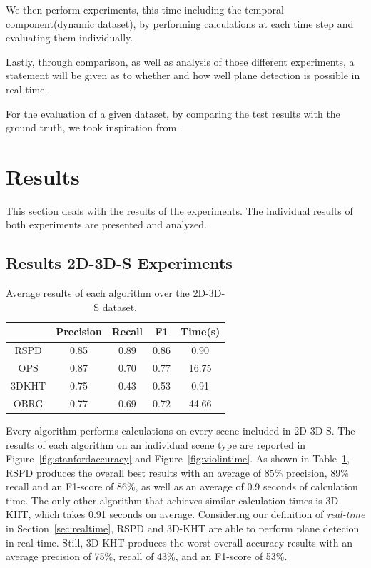 \documentclass[main.tex]{subfiles}
\begin{document}
We then perform experiments, this time including the temporal component(dynamic dataset), by performing calculations at each time step and evaluating them individually.

Lastly, through comparison, as well as analysis of those different experiments, a statement will be given as to whether and how well plane detection is
possible in real-time.

For the evaluation of a given dataset, by comparing the test results with the ground truth, we took inspiration from \citeauthor{Araújo_Oliveira_2020} \cite[Section~4]{Araújo_Oliveira_2020}.


\section{Results}
This section deals with the results of the experiments. The individual results of both experiments are presented and analyzed. 

\subsection{Results 2D-3D-S Experiments}

\begin{table}[H]
    \centering
    \begin{tabular}{c|cccc}
              & Precision & Recall & F1   & Time(s) \\ \hline
        RSPD  & 0.85      & 0.89   & 0.86 & 0.90    \\
        OPS   & 0.87      & 0.70   & 0.77 & 16.75   \\
        3DKHT & 0.75      & 0.43   & 0.53 & 0.91    \\
        OBRG  & 0.77      & 0.69   & 0.72 & 44.66
    \end{tabular}
    \caption[Overall 2D-3D-S Results]{Average results of each algorithm over the 2D-3D-S dataset.}
    \label{tab:algo-acc}
\end{table}

Every algorithm performs calculations on every scene included in 2D-3D-S.
The results of each algorithm on an individual scene type are reported in Figure~\ref{fig:stanfordaccuracy} and Figure~\ref{fig:violintime}. As shown in Table~\ref{tab:algo-acc},
RSPD produces the overall best results with an average of 85\% precision, 89\% recall and an F1-score of 86\%, as well as an average of 0.9 seconds of calculation time.
The only other algorithm that achieves similar calculation times is 3D-KHT, which takes 0.91 seconds on average. Considering our definition of \textit{real-time} in Section~\ref{sec:realtime},
RSPD and 3D-KHT are able to perform plane detecion in real-time. Still, 3D-KHT produces the worst overall accuracy results with an average precision of 75\%, recall of 43\%, and an F1-score of 53\%.
\end{document}
